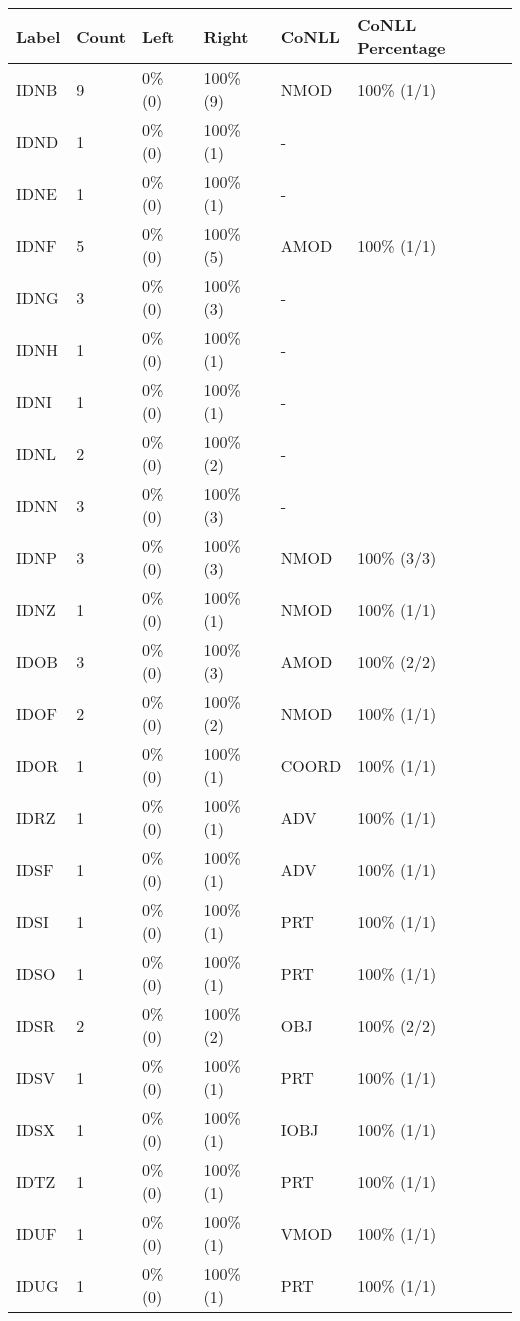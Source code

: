 \begin{figure*}
\begin{tabular}{|l|l|l|l||l|l|}
\hline
Label & Count & Left & Right & CoNLL & CoNLL Percentage\\ 
\hline
 IDNB & 9 & 0\% (0) & 100\% (9) & NMOD & 100\% (1/1) \\ 
\hline
 IDND & 1 & 0\% (0) & 100\% (1) & - &  \\ 
\hline
 IDNE & 1 & 0\% (0) & 100\% (1) & - &  \\ 
\hline
 IDNF & 5 & 0\% (0) & 100\% (5) & AMOD & 100\% (1/1) \\ 
\hline
 IDNG & 3 & 0\% (0) & 100\% (3) & - &  \\ 
\hline
 IDNH & 1 & 0\% (0) & 100\% (1) & - &  \\ 
\hline
 IDNI & 1 & 0\% (0) & 100\% (1) & - &  \\ 
\hline
 IDNL & 2 & 0\% (0) & 100\% (2) & - &  \\ 
\hline
 IDNN & 3 & 0\% (0) & 100\% (3) & - &  \\ 
\hline
 IDNP & 3 & 0\% (0) & 100\% (3) & NMOD & 100\% (3/3) \\ 
\hline
 IDNZ & 1 & 0\% (0) & 100\% (1) & NMOD & 100\% (1/1) \\ 
\hline
 IDOB & 3 & 0\% (0) & 100\% (3) & AMOD & 100\% (2/2) \\ 
\hline
 IDOF & 2 & 0\% (0) & 100\% (2) & NMOD & 100\% (1/1) \\ 
\hline
 IDOR & 1 & 0\% (0) & 100\% (1) & COORD & 100\% (1/1) \\ 
\hline
 IDRZ & 1 & 0\% (0) & 100\% (1) & ADV & 100\% (1/1) \\ 
\hline
 IDSF & 1 & 0\% (0) & 100\% (1) & ADV & 100\% (1/1) \\ 
\hline
 IDSI & 1 & 0\% (0) & 100\% (1) & PRT & 100\% (1/1) \\ 
\hline
 IDSO & 1 & 0\% (0) & 100\% (1) & PRT & 100\% (1/1) \\ 
\hline
 IDSR & 2 & 0\% (0) & 100\% (2) & OBJ & 100\% (2/2) \\ 
\hline
 IDSV & 1 & 0\% (0) & 100\% (1) & PRT & 100\% (1/1) \\ 
\hline
 IDSX & 1 & 0\% (0) & 100\% (1) & IOBJ & 100\% (1/1) \\ 
\hline
 IDTZ & 1 & 0\% (0) & 100\% (1) & PRT & 100\% (1/1) \\ 
\hline
 IDUF & 1 & 0\% (0) & 100\% (1) & VMOD & 100\% (1/1) \\ 
\hline
 IDUG & 1 & 0\% (0) & 100\% (1) & PRT & 100\% (1/1) \\ 

\end{tabular}
\end{figure*}
